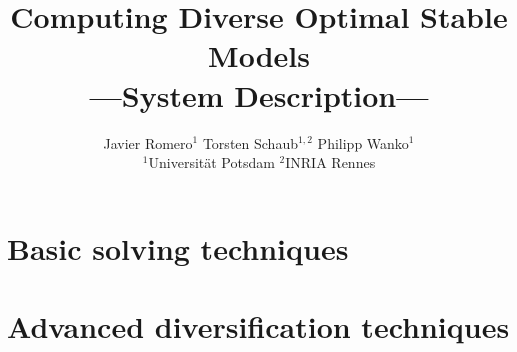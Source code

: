 \documentclass[fleqn]{new_tlp}
\title[Computing Diverse Optimal Stable Models]{Computing Diverse Optimal Stable Models\\[4pt]\small{---System Description---}}
\author[Javier Romero, Torsten Schaub, Philipp Wanko]{%
  Javier Romero$^1$
  \quad
  Torsten Schaub$^{1,2}$%
  \quad
  Philipp Wanko$^1$
  \\
  $^1$Universit\"at Potsdam
  \quad
  $^2$INRIA Rennes}
\begin{document}
\maketitle
%

%



\section{Basic solving techniques}\label{sec:basic}




\section{Advanced diversification techniques}\label{sec:advanced}


%




\clearpage
\appendix


\end{document}
